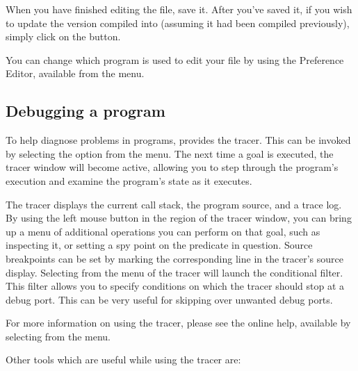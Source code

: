 When you have finished editing the file, save it.
After you've saved it, if you wish to update the version compiled into
{\eclipse} (assuming it had been compiled previously), simply click on the
 button.

You can change which program is used to edit your file by using the
{\tkeclipse} Preference Editor, available from the  menu.

\subsection{Debugging a program}
\label{secdebug}

To help diagnose problems in {\eclipse} programs, {\tkeclipse} provides the
tracer.
This can be invoked by selecting the  option from the
 menu.
The next time a goal is executed, the tracer window will become active,
allowing you to step through the program's execution and examine the
program's state as it executes.

The tracer displays the current call stack, the program source, and a trace log.
By using the left mouse button in the  region of the
tracer window, you can bring up a menu of additional operations you can
perform on that goal, such as inspecting it, or setting a spy point on the
predicate in question.  Source breakpoints can be set by marking the
corresponding line in the tracer's source display.
Selecting  from the  menu
of the tracer will launch the conditional filter.
This filter allows you to
specify conditions on which the tracer should stop at a debug port. This
can be very useful for skipping over unwanted debug ports.

For more information on using the tracer, please see the online help,
available by selecting  from the  menu.

Other {\tkeclipse} tools which are useful while using the tracer are:

